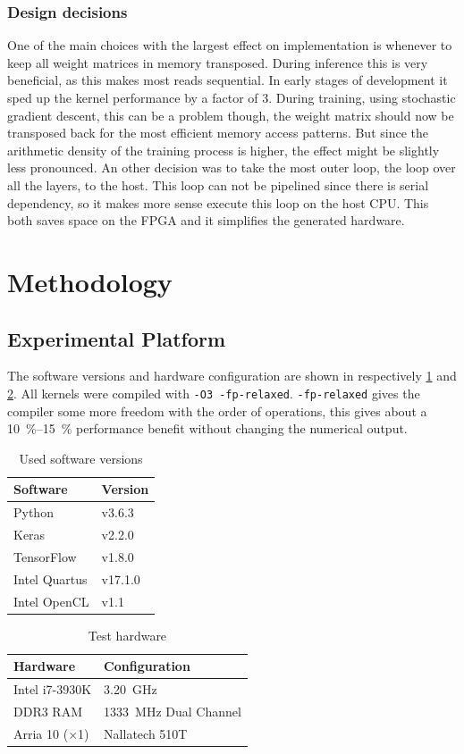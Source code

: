 \documentclass[techrep,english]{ipsj} %
\begin{document}
\subsubsection{Design decisions}
One of the main choices with the largest effect on implementation is whenever to keep all weight matrices in memory transposed.
During inference this is very beneficial, as this makes most reads sequential.
In early stages of development it sped up the kernel performance by a factor of \num{3}.
During training, using stochastic gradient descent, this can be a problem though, the weight matrix should now be transposed back for the most efficient memory access patterns.
But since the arithmetic density of the training process is higher, the effect might be slightly less pronounced.
An other decision was to take the most outer loop, the loop over all the layers, to the host.
This loop can not be pipelined since there is serial dependency, so it makes more sense execute this loop on the host CPU.
This both saves space on the FPGA and it simplifies the generated hardware.

\section{Methodology}\label{sec:method}
\subsection{Experimental Platform}
The software versions and hardware configuration are shown in respectively \cref{tab:software-versions} and \cref{tab:test-hardware}.
All kernels were compiled with \texttt{-O3 -fp-relaxed}.
\texttt{-fp-relaxed} gives the compiler some more freedom with the order of operations, this gives about a \SIrange{10}{15}{\percent} performance benefit without changing the numerical output.
\begin{table}[h]
  \centering
  \caption{Used software versions}\label{tab:software-versions}
  \begin{tabular}{ll}
    \toprule
    \textbf{Software} & \textbf{Version} \\
    \midrule
    Python & v3.6.3 \\
    Keras & v2.2.0 \\
    TensorFlow & v1.8.0 \\
    Intel Quartus & v17.1.0 \\
    Intel OpenCL & v1.1 \\
    \bottomrule
  \end{tabular}
\end{table}
\begin{table}[h]
  \centering
  \caption{Test hardware}\label{tab:test-hardware}
  \begin{tabular}{ll}
    \toprule
    \textbf{Hardware} & \textbf{Configuration} \\
    \midrule
    Intel i7-3930K & \SI{3.20}{\giga\hertz} \\
    DDR3 RAM & \SI{1333}{\mega\hertz} Dual Channel \\
    Arria 10 ($\times$1) & Nallatech 510T \\
    \bottomrule
  \end{tabular}
\end{table}
\end{document}

